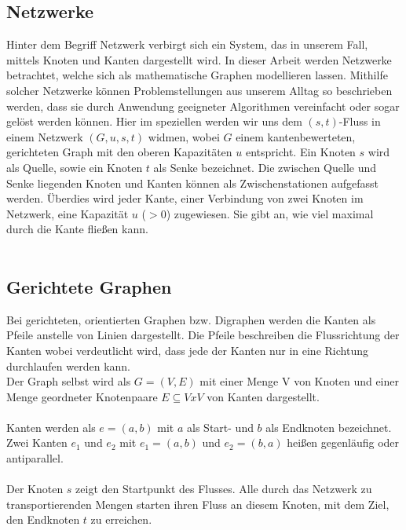 \documentclass[a4paper]{llncs}
\begin{document}
\subsection{Netzwerke}
\label{Netzwerke}
Hinter dem Begriff Netzwerk verbirgt sich ein System, das in unserem Fall, mittels Knoten und Kanten dargestellt wird. In dieser Arbeit werden Netz\-werke betrachtet, welche sich als mathematische Graphen modellieren lassen. Mithilfe solcher Netzwerke können Problemstellungen aus unserem Alltag so beschrieben werden, dass sie durch Anwendung geeigneter Algorithmen ver\-einfacht oder sogar gelöst werden können. Hier im speziellen werden wir uns dem $(s,t)$-Fluss in einem Netzwerk $(G,u,s,t)$ widmen, wobei  $G$ einem kanten\-bewerteten, gerichteten Graph mit den oberen Kapazitäten $u$ entspricht. Ein Knoten $s$ wird als Quelle, sowie ein Knoten $t$ als Senke bezeichnet. Die zwischen Quelle und Senke liegenden Knoten und Kanten können als Zwischenstationen aufgefasst werden. Überdies wird jeder Kante, einer Verbindung von zwei Knoten im Netzwerk, eine Kapazität $u$ ($>0$) zugewiesen. Sie gibt an, wie viel maximal durch die Kante fließen kann.\\ \\
\citep{Optimierungsmodell}


\subsection{Gerichtete Graphen}
\label{Graph}
Bei gerichteten, orientierten Graphen bzw. Digraphen werden die Kanten als Pfeile anstelle von Linien dargestellt. Die Pfeile beschreiben die Flussrichtung der Kanten wobei verdeutlicht wird, dass jede der Kanten nur in eine Richtung durchlaufen werden kann.\\

Der Graph selbst wird als
$G = (V,E)$ mit einer Menge V von Knoten und einer Menge
geordneter Knotenpaare $E \subseteq V x V$ von Kanten dargestellt.\\ \\
Kanten werden als 
$e = (a,b)$
mit $a$ als Start- und $b$ als Endknoten bezeichnet.
Zwei Kanten $e_{1}$ und $e_{2}$ mit 
$e_{1} = (a,b)$ und $e_{2} = (b,a)$
heißen gegenläufig oder antiparallel.\\ \\
Der Knoten $s$ zeigt den Startpunkt des Flusses. Alle durch das Netzwerk zu transportierenden Mengen starten ihren Fluss an diesem Knoten, mit dem Ziel, den Endknoten $t$ zu erreichen.\\ 
\end{document}

